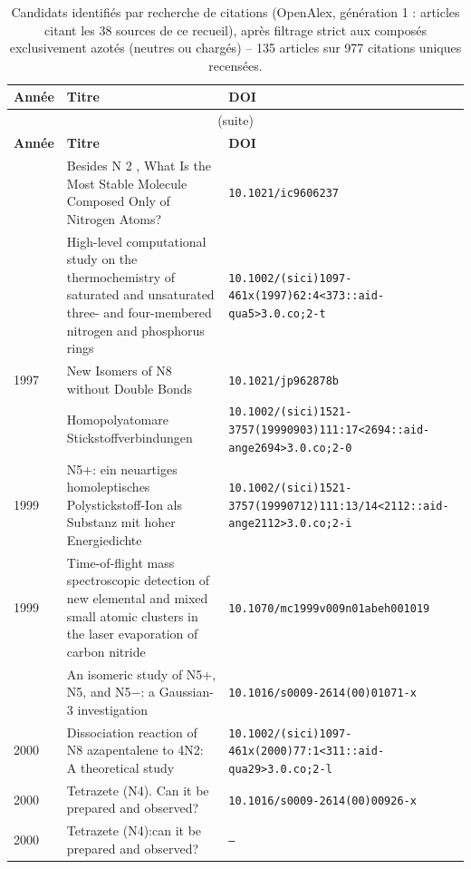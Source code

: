\begin{longtable}{@{}p{1.0cm}p{10.5cm}p{3.5cm}@{}}
\caption{Candidats identifi\'es par recherche de citations (OpenAlex, g\'en\'eration 1 : articles citant les 38 sources de ce recueil), apr\`es filtrage strict aux compos\'es exclusivement azot\'es (neutres ou charg\'es) -- 135 articles sur 977 citations uniques recens\'ees.}
\label{tab:citation-search-candidates}\\
\toprule
\textbf{Ann\'ee} & \textbf{Titre} & \textbf{DOI} \\
\midrule
\endfirsthead
\multicolumn{3}{c}{\small (suite)}\\
\toprule
\textbf{Ann\'ee} & \textbf{Titre} & \textbf{DOI} \\
\midrule
\endhead
\bottomrule
\endfoot
\bottomrule
\endlastfoot
\addlinespace
1996 & Besides N 2 , What Is the Most Stable Molecule Composed Only of Nitrogen Atoms? & \small\texttt{10.1021/ic9606237} \\
\addlinespace
1997 & High-level computational study on the thermochemistry of saturated and unsaturated three- and four-membered nitrogen and phosphorus rings & \small\texttt{10.1002/(sici)1097-461x(1997)62:4<373::aid-qua5>3.0.co;2-t} \\
1997 & New Isomers of N8 without Double Bonds & \small\texttt{10.1021/jp962878b} \\
\addlinespace
1999 & Homopolyatomare Stickstoffverbindungen & \small\texttt{10.1002/(sici)1521-3757(19990903)111:17<2694::aid-ange2694>3.0.co;2-0} \\
1999 & N5+: ein neuartiges homoleptisches Polystickstoff-Ion als Substanz mit hoher Energiedichte & \small\texttt{10.1002/(sici)1521-3757(19990712)111:13/14<2112::aid-ange2112>3.0.co;2-i} \\
1999 & Time-of-flight mass spectroscopic detection of new elemental and mixed small atomic clusters in the laser evaporation of carbon nitride & \small\texttt{10.1070/mc1999v009n01abeh001019} \\
\addlinespace
2000 & An isomeric study of N5+, N5, and N5−: a Gaussian-3 investigation & \small\texttt{10.1016/s0009-2614(00)01071-x} \\
2000 & Dissociation reaction of N8 azapentalene to 4N2: A theoretical study & \small\texttt{10.1002/(sici)1097-461x(2000)77:1<311::aid-qua29>3.0.co;2-l} \\
2000 & Tetrazete (N4). Can it be prepared and observed? & \small\texttt{10.1016/s0009-2614(00)00926-x} \\
2000 & Tetrazete (N4):can it be prepared and observed? & \small\texttt{--} \\

\end{longtable}

